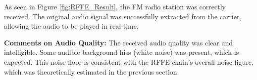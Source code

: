 As seen in Figure \ref{fig:RFFE_Result}, the FM radio station was correctly received. The original audio signal was successfully extracted from the carrier, allowing the audio to be played in real-time. 

\textbf{Comments on Audio Quality:} The received audio quality was clear and intelligible. Some audible background hiss (white noise) was present, which is expected. This noise floor is consistent with the RFFE chain's overall noise figure, which was theoretically estimated in the previous section.